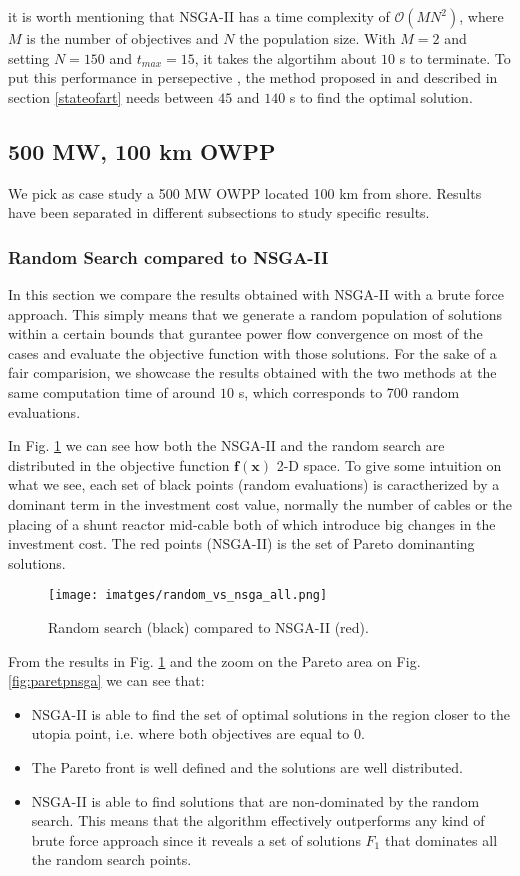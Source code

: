 \documentclass[a4paper,11pt, titlepage, twoside]{article}
\begin{document}
it is worth mentioning that NSGA-II has a time complexity of $\mathcal{O}(MN^2)$, where $M$ is the number of objectives and $N$ the population size. With $M=2$ and setting $N=150$ and $t_{max}=15$,
it takes the algortihm about $10$ s to terminate. To put this performance in persepective , the method proposed in \cite{paperbase} and described in section \ref{stateofart} needs between $45$ and $140$ s to find the optimal solution.


\subsection{500 MW, 100 km OWPP}

We pick as case study a 500 MW OWPP located 100 km from shore. Results have been separated in different subsections to study specific results.

\subsubsection{Random Search compared to NSGA-II}

In this section we compare the results obtained with NSGA-II with a brute force approach. This simply means that we generate a random population of solutions within a certain bounds that gurantee power flow convergence on most of the cases and evaluate the objective function with those solutions.
For the sake of a fair comparision, we showcase the results obtained with the two methods at the same computation time of around $10$ s, which corresponds to 700 random evaluations.

In Fig. \ref{fig:searchall} we can see how both the NSGA-II and the random search are distributed in the objective function $\mathbf{f(x)}$ 2-D space. To give some intuition on what we see, each set of black points (random evaluations) is caractherized by a dominant term in the investment cost value, normally the number of cables or the placing 
of a shunt reactor mid-cable both of which introduce big changes in the investment cost. The red points (NSGA-II) is the set of Pareto dominanting solutions.
\begin{figure}[H]
    \centering
    \texttt{[image: imatges/random\_vs\_nsga\_all.png]}
    \caption{Random search (black) compared to NSGA-II (red).}
    \label{fig:searchall}
\end{figure}

From the results in Fig. \ref{fig:searchall} and the zoom on the Pareto area on Fig. \ref{fig:paretpnsga} we can see that:
\begin{itemize}
    \item NSGA-II is able to find the set of optimal solutions in the region closer to the utopia point, i.e. where both objectives are equal to 0.
    \item The Pareto front is well defined and the solutions are well distributed.
    \item NSGA-II is able to find solutions that are non-dominated by the random search. This means that the algorithm effectively outperforms any kind of brute force approach
    since it reveals a  set of solutions $F_1$ that dominates all the random search points.
\end{itemize}
\end{document}
